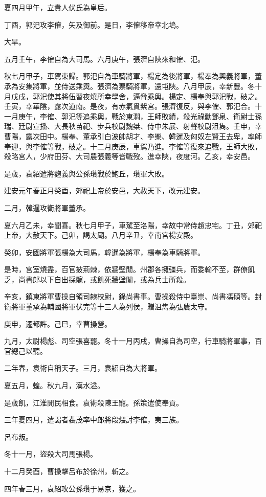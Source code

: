 \begin{pinyinscope}
夏四月甲午，立貴人伏氏為皇后。

丁酉，郭汜攻李傕，矢及御前。是日，李傕移帝幸北塢。

大旱。

五月壬午，李傕自為大司馬。六月庚午，張濟自陝來和傕、汜。

秋七月甲子，車駕東歸。郭汜自為車騎將軍，楊定為後將軍，楊奉為興義將軍，董承為安集將軍，並侍送乘輿。張濟為票騎將軍，還屯陝。八月甲辰，幸新豐。冬十月戊戌，郭汜使其將伍習夜燒所幸學舍，逼脅乘輿。楊定、楊奉與郭汜戰，破之。壬寅，幸華陰，露次道南。是夜，有赤氣貫紫宮。張濟復反，與李傕、郭汜合。十一月庚午，李傕、郭汜等追乘輿，戰於東澗，王師敗績，殺光祿勳鄧泉、衛尉士孫瑞、廷尉宣播、大長秋苗祀、步兵校尉魏桀、侍中朱展、射聲校尉沮雋。壬申，幸曹陽，露次田中。楊奉、董承引白波帥胡才、李樂、韓暹及匈奴左賢王去卑，率師奉迎，與李傕等戰，破之。十二月庚辰，車駕乃進。李傕等復來追戰，王師大敗，殺略宮人，少府田芬、大司農張義等皆戰歿。進幸陝，夜度河。乙亥，幸安邑。

是歲，袁紹遣將麴義與公孫瓚戰於鮑丘，瓚軍大敗。

建安元年春正月癸酉，郊祀上帝於安邑，大赦天下，改元建安。

二月，韓暹攻衛將軍董承。

夏六月乙未，幸聞喜。秋七月甲子，車駕至洛陽，幸故中常侍趙忠宅。丁丑，郊祀上帝，大赦天下。己卯，謁太廟。八月辛丑，幸南宮楊安殿。

癸卯，安國將軍張楊為大司馬，韓暹為將軍，楊奉為車騎將軍。

是時，宮室燒盡，百官披荊棘，依牆壁閒。州郡各擁彊兵，而委輸不至，群僚飢乏，尚書郎以下自出採髋，或飢死牆壁閒，或為兵士所殺。

辛亥，鎮東將軍曹操自領司隸校尉，錄尚書事。曹操殺侍中臺崇、尚書馮碩等。封衛將軍董承為輔國將軍伏完等十三人為列侯，贈沮雋為弘農太守。

庚申，遷都許。己巳，幸曹操營。

九月，太尉楊彪、司空張喜罷。冬十一月丙戌，曹操自為司空，行車騎將軍事，百官總己以聽。

二年春，袁術自稱天子。三月，袁紹自為大將軍。

夏五月，蝗。秋九月，漢水溢。

是歲飢，江淮閒民相食。袁術殺陳王寵。孫策遣使奉貢。

三年夏四月，遣謁者裴茂率中郎將段煨討李傕，夷三族。

呂布叛。

冬十一月，盜殺大司馬張楊。

十二月癸酉，曹操擊呂布於徐州，斬之。

四年春三月，袁紹攻公孫瓚于易京，獲之。


\end{pinyinscope}
